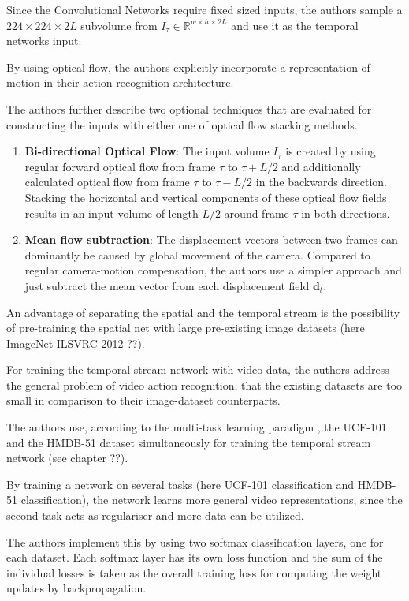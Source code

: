 Since the Convolutional Networks require fixed sized inputs, the authors sample a $224 \times 224 \times 2L$ subvolume from $I_\tau \in \mathbb{R}^{w \times h \times 2L}$ and use it as the temporal networks input.

By using optical flow, the authors explicitly incorporate a representation of motion in their action recognition architecture.

The authors further describe two optional techniques that are evaluated for constructing the inputs with either one of optical flow stacking methods.
\begin{enumerate}
    \item \textbf{Bi-directional Optical Flow}: The input volume $I_{\tau}$ is created by using regular forward optical flow from frame $\tau$ to $\tau + L/2$ and additionally calculated optical flow from frame $\tau$ to $\tau - L/2$ in the backwards direction. Stacking the horizontal and vertical components of these optical flow fields results in an input volume of length $L/2$ around frame $\tau$ in both directions. 
    \item \textbf{Mean flow subtraction}: The displacement vectors between two frames can dominantly be caused by global movement of the camera. Compared to regular camera-motion compensation, the authors use a simpler approach and just subtract the mean vector from each displacement field $\mathbf{d}_t$.
\end{enumerate}

An advantage of separating the spatial and the temporal stream is the possibility of pre-training the spatial net with large pre-existing image datasets (here ImageNet ILSVRC-2012 ??).

For training the temporal stream network with video-data, the authors address the general problem of video action recognition, that the existing datasets are too small in comparison to their image-dataset counterparts.

The authors use, according to the multi-task learning paradigm \cite{collobert_unified_2008}, the UCF-101 and the HMDB-51 dataset simultaneously for training the temporal stream network (see chapter ??). 

By training a network on several tasks (here UCF-101 classification and HMDB-51 classification), the network learns more general video representations, since the second task acts as regulariser and more data can be utilized.

The authors implement this by using two softmax classification layers, one for each dataset. Each softmax layer has its own loss function and the sum of the individual losses is taken as the overall training loss for computing the weight updates by backpropagation.

